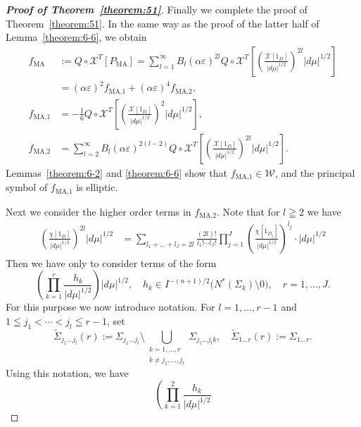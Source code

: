 \documentclass[a4paper,11pt,reqno]{amsart}
\numberwithin{equation}{section}
\theoremstyle{definition}
\theoremstyle{remark}
\begin{document}
%
%
\begin{proof}[{\bf Proof of Theorem~\ref{theorem:51}}]
Finally we complete the proof of Theorem~\ref{theorem:51}. 
In the same way as the proof of the latter half of Lemma~\ref{theorem:6-6}, 
we obtain 
%
%
\begin{align*}
  f_\text{MA}
& :=
  Q\circ\mathcal{X}^T[P_\text{MA}]
  =
  \sum_{l=1}^\infty
  B_l(\alpha\varepsilon)^{2l}
  Q\circ\mathcal{X}^T
  \left[
  \left(\frac{\mathcal{X}[1_D]}{\lvert{d\mu}\rvert^{1/2}}\right)^{2l}
  \lvert{d\mu}\rvert^{1/2}
  \right]
\\
& =
  (\alpha\varepsilon)^2f_\text{MA,1}
  +
  (\alpha\varepsilon)^4f_\text{MA,2},
\\
  f_\text{MA,1}
& =
  -
  \frac{1}{6}
  Q\circ\mathcal{X}^T
  \left[
  \left(\frac{\mathcal{X}[1_D]}{\lvert{d\mu}\rvert^{1/2}}\right)^2
  \lvert{d\mu}\rvert^{1/2}
  \right],
\\
  f_\text{MA,2}
& =
  \sum_{l=2}^\infty
  B_l(\alpha\varepsilon)^{2(l-2)}
  Q\circ\mathcal{X}^T
  \left[
  \left(\frac{\mathcal{X}[1_D]}{\lvert{d\mu}\rvert^{1/2}}\right)^{2l}
  \lvert{d\mu}\rvert^{1/2}
  \right].
\end{align*}
%
%
Lemmas~\ref{theorem:6-2} and \ref{theorem:6-6} show that $f_\text{MA,1} \in \mathcal{W}$, 
and the principal symbol of $f_\text{MA,1}$ is elliptic. 
%
\par
%
Next we consider the higher order terms in $f_\text{MA,2}$. 
Note that for $l\geqq2$ we have 
%
%
\begin{align*}
  \left(
  \frac{\chi[1_D]}{\lvert{d\mu}\rvert^{1/2}}
  \right)^{2l}
  \lvert{d\mu}\rvert^{1/2}
& =
  \sum_{l_1+\dotsc+l_J=2l}
  \frac{(2l)!}{l_1!\dotsb{l_J!}}
  \prod_{j=1}^J
  \left(
  \frac{\chi[1_{D_j}]}{\lvert{d\mu}\rvert^{1/2}}
  \right)^{l_j}
  \cdot
  \lvert{d\mu}\rvert^{1/2}
\end{align*}
%
%
Then we have only to consider terms of the form 
%
%
$$
\left(
\prod_{k=1}^r
\frac{h_k}{\lvert{d\mu}\rvert^{1/2}}
\right)
\lvert{d\mu}\rvert^{1/2},
\quad
h_k \in I^{-(n+1)/2}\bigl(N^\ast(\Sigma_k)\setminus0\bigr),
\quad
r=1,\dotsc,J.
$$
%
%
For this purpose we now introduce notation. 
For $l=1,\dotsc,r-1$ and $1 \leqq j_1 <\dotsb<j_l \leqq r-1$, set
%
%
$$
\tilde{\Sigma}_{j_1\dotsc{j_l}}(r)
:=
\Sigma_{j_1\dotsc{j_l}}
\setminus
\bigcup_{\substack{k=1,\dotsc,r \\ k{\ne}j_1,\dotsc,j_l}}
\Sigma_{j_1{\dotsc}j_lk}, 
\quad
\tilde{\Sigma}_{1\dotsc{r}}(r):=\Sigma_{1\dotsc{r}}. 
$$
%
%
Using this notation, we have 
%
%
$$
\left(
\prod_{k=1}^2
\frac{h_k}{\lvert{d\mu}\rvert^{1/2}}
$$
\end{proof}
\end{document}
